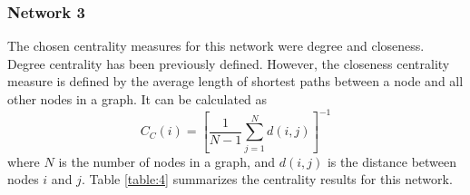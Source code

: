 \subsubsection{Network 3}
The chosen centrality measures for this network were degree and closeness. Degree centrality has been previously defined. However, the closeness centrality measure is defined by the average length of shortest paths between a node and all other nodes in a graph. It can be calculated as
\begin{equation}
    C_C(i) = \left[\frac{1}{N-1}\sum_{j=1}^{N}d(i,j)\right]^{-1}
    \label{equation:closeness_centrality}
\end{equation}
where $N$ is the number of nodes in a graph, and $d(i,j)$ is the distance between nodes $i$ and $j$. Table \ref{table:4} summarizes the centrality results for this network.
\begin{table}
    \centering
    \qquad
    \caption{Network 3 centrality}
    \label{table:4}
\end{table}

